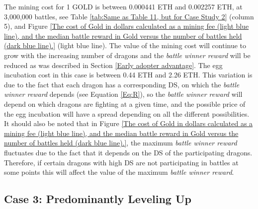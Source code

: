 \documentclass[12pt]{article}
\begin{document}
{The mining cost for 1 GOLD is between 0.000441 ETH and 0.002257 ETH, at 3,000,000 battles, see Table \ref{tab:Same as Table 11, but for Case Study 2} (column 5), and Figure \ref{The cost of Gold in dollars calculated as a mining fee (light blue line), and the median battle reward in Gold versus the number of battles held (dark blue line).} (light blue line). The value of the mining cost will continue to grow with the increasing number of dragons and the \textit{battle winner reward} will be reduced as was described in Section \ref{Early adopter advantage}. The egg incubation cost in this case is between 0.44 ETH and 2.26 ETH. This variation is due to the fact that each dragon has a corresponding DS, on which the {\it battle winner reward} depends (see Equation \ref{Eq:R}), so the {\it battle winner reward} will depend on which dragons are fighting at a given time, and the possible price of the egg incubation will have a spread depending on all the different possibilities. It should also be noted that in Figure \ref{The cost of Gold in dollars calculated as a mining fee (light blue line), and the median battle reward in Gold versus the number of battles held (dark blue line).}, the maximum {\it battle winner reward} fluctuates due to the fact that it depends on the DS of the participating dragons. Therefore, if certain dragons with high DS are not participating in battles at some points this will affect the value of the maximum {\it battle winner reward}.\par


\subsection{Case 3: Predominantly Leveling Up}
\label{Case 3: Predominantly Leveling Up} \par




}
\end{document}
